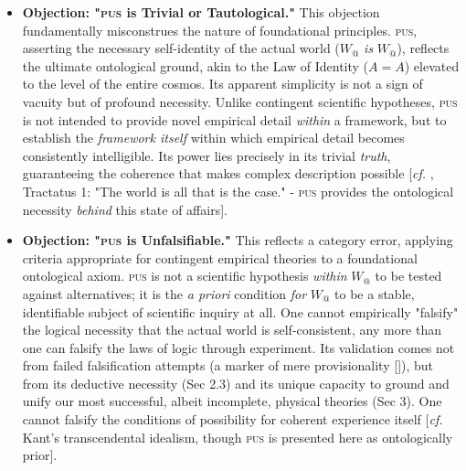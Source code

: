 \documentclass[11pt, a4paper]{article}
\makeatletter
\newcommand{\pus}{\textsc{pus}} %
\newcommand{\Wactual}{W_{@}} %
\makeatother
\begin{document}
\begin{itemize}
    \item \textbf{Objection: "\pus{} is Trivial or Tautological."} This objection fundamentally misconstrues the nature of foundational principles. \pus, asserting the necessary self-identity of the actual world ($\Wactual$ \textit{is} $\Wactual$), reflects the ultimate ontological ground, akin to the Law of Identity ($A=A$) elevated to the level of the entire cosmos. Its apparent simplicity is not a sign of vacuity but of profound necessity. Unlike contingent scientific hypotheses, \pus{} is not intended to provide novel empirical detail \textit{within} a framework, but to establish the \textit{framework itself} within which empirical detail becomes consistently intelligible. Its power lies precisely in its trivial \textit{truth}, guaranteeing the coherence that makes complex description possible [\textit{cf.} \citealp{wittgenstein1922}, Tractatus 1: "The world is all that is the case." - \pus{} provides the ontological necessity \textit{behind} this state of affairs].

    \item \textbf{Objection: "\pus{} is Unfalsifiable."} This reflects a category error, applying criteria appropriate for contingent empirical theories to a foundational ontological axiom. \pus{} is not a scientific hypothesis \textit{within} $\Wactual$ to be tested against alternatives; it is the \textit{a priori} condition \textit{for} $\Wactual$ to be a stable, identifiable subject of scientific inquiry at all. One cannot empirically "falsify" the logical necessity that the actual world is self-consistent, any more than one can falsify the laws of logic through experiment. Its validation comes not from failed falsification attempts (a marker of mere provisionality [\citealp{popper1959}]), but from its deductive necessity (Sec 2.3) and its unique capacity to ground and unify our most successful, albeit incomplete, physical theories (Sec 3). One cannot falsify the conditions of possibility for coherent experience itself [\textit{cf.} Kant's transcendental idealism, though \pus{} is presented here as ontologically prior].


\end{itemize}
\end{document}
